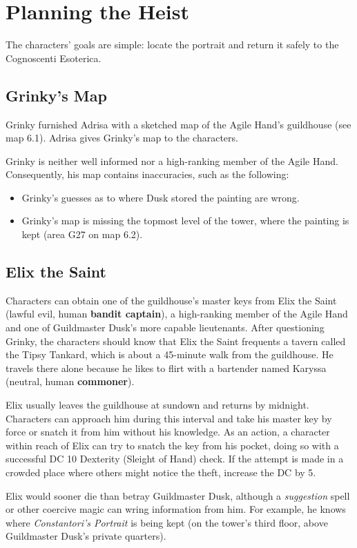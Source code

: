 \documentclass[10pt,a4paper,twoside,bg=print,twocolumn,openany,nodeprecatedcode]{dndbook}
\begin{document}
\section{Planning the Heist}
The characters' goals are simple: locate the portrait and return it safely to the Cognoscenti Esoterica.

\subsection{Grinky's Map}
Grinky furnished Adrisa with a sketched map of the Agile Hand's guildhouse (see map 6.1). Adrisa gives Grinky's map to the characters.

Grinky is neither well informed nor a high-ranking member of the Agile Hand. Consequently, his map contains inaccuracies, such as the following:


\begin{itemize}
\item Grinky's guesses as to where Dusk stored the painting are wrong.
\item Grinky's map is missing the topmost level of the tower, where the painting is kept (area G27 on map 6.2).
\end{itemize}

\subsection{Elix the Saint}
Characters can obtain one of the guildhouse's master keys from Elix the Saint (lawful evil, human \textbf{bandit captain}), a high-ranking member of the Agile Hand and one of Guildmaster Dusk's more capable lieutenants. After questioning Grinky, the characters should know that Elix the Saint frequents a tavern called the Tipsy Tankard, which is about a 45-minute walk from the guildhouse. He travels there alone because he likes to flirt with a bartender named Karyssa (neutral, human \textbf{commoner}).

Elix usually leaves the guildhouse at sundown and returns by midnight. Characters can approach him during this interval and take his master key by force or snatch it from him without his knowledge. As an action, a character within reach of Elix can try to snatch the key from his pocket, doing so with a successful DC 10 Dexterity (Sleight of Hand) check. If the attempt is made in a crowded place where others might notice the theft, increase the DC by 5.

Elix would sooner die than betray Guildmaster Dusk, although a \textit{suggestion} spell or other coercive magic can wring information from him. For example, he knows where \textit{Constantori's Portrait} is being kept (on the tower's third floor, above Guildmaster Dusk's private quarters).
\end{document}
